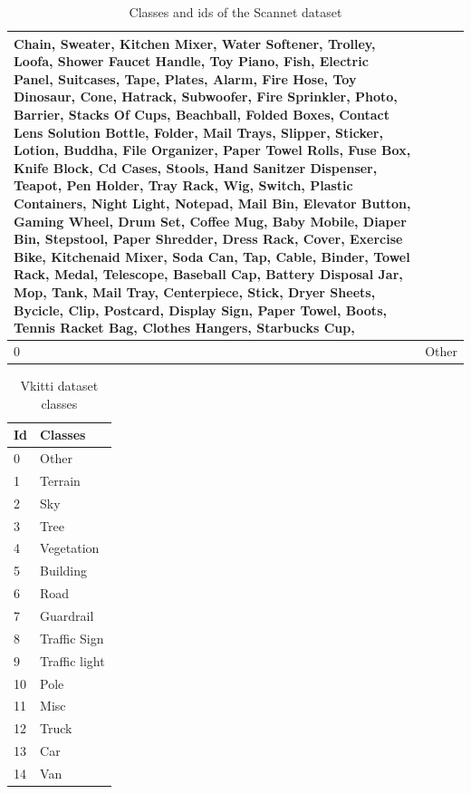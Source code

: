 \begin{table}
\begin{center}
\begin{tabular}{ | l | p{14cm} |}
Chain, Sweater, Kitchen Mixer, Water Softener, Trolley, Loofa, Shower Faucet Handle, Toy Piano, Fish, Electric Panel, Suitcases, Tape, Plates, Alarm, Fire Hose, Toy Dinosaur, Cone, Hatrack, Subwoofer, Fire Sprinkler, Photo, Barrier, Stacks Of Cups, Beachball, Folded Boxes, Contact Lens Solution Bottle, Folder, Mail Trays, Slipper, Sticker, Lotion, Buddha, File Organizer, Paper Towel Rolls, Fuse Box, Knife Block, Cd Cases, Stools, Hand Sanitzer Dispenser, Teapot, Pen Holder, Tray Rack, Wig, Switch, Plastic Containers, Night Light, Notepad, Mail Bin, Elevator Button, Gaming Wheel, Drum Set, Coffee Mug, Baby Mobile, Diaper Bin, Stepstool, Paper Shredder, Dress Rack, Cover, Exercise Bike, Kitchenaid Mixer, Soda Can, Tap, Cable, Binder, Towel Rack, Medal, Telescope, Baseball Cap, Battery Disposal Jar, Mop, Tank, Mail Tray, Centerpiece, Stick, Dryer Sheets, Bycicle, Clip, Postcard, Display Sign, Paper Towel, Boots, Tennis Racket Bag, Clothes Hangers, Starbucks Cup, \\ \hline
    			
    			0 & Other \\ \hline
    			\hline
    			
    			
    		\end{tabular}
    		\caption{Classes and ids of the Scannet dataset}
    		\label{table:Classes in scannet_3}
    	\end{center}
    \end{table}
	
 	\begin{table}
		\begin{center}
			\begin{tabular}{ | l | p{16cm} |}
				\hline
				
				\cellcolor{purple!30}Id & \cellcolor{purple!30}Classes \\ \hline
				0 & Other \\ \hline
				1 & Terrain \\ \hline
				2 & Sky \\ \hline
				3 & Tree \\ \hline
				4 & Vegetation \\ \hline
				5 & Building \\ \hline
				6 & Road \\ \hline
				7 & Guardrail \\ \hline
				8 & Traffic Sign \\ \hline
				9 & Traffic light \\ \hline
				10 & Pole \\ \hline
				11 & Misc \\ \hline
				12 & Truck \\ \hline
				13 & Car \\ \hline
				14 & Van \\ \hline
				\hline
			\end{tabular}
			\caption{Vkitti dataset classes}
			\label{table:Classes in scannet_2}
		\end{center}
	\end{table}
	
